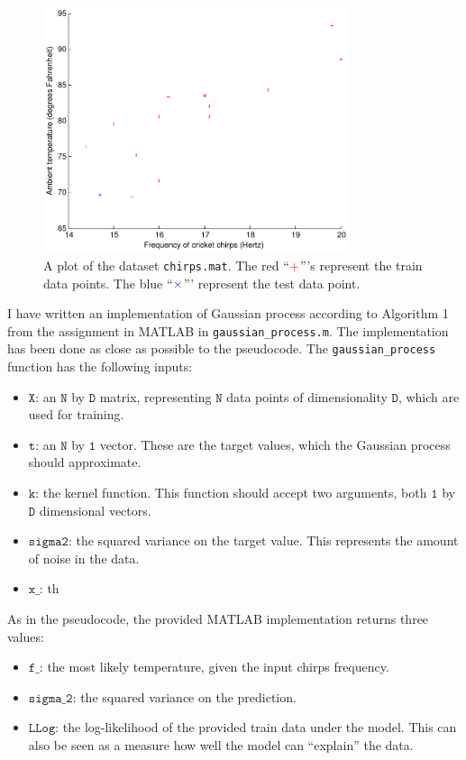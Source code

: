 \documentclass[a4paper,11pt]{article}
\newcommand{\T}[1]{\ensuremath{\mathtt{#1}}}
\begin{document}
\begin{figure}
  \begin{center}
  \caption{A plot of the dataset \texttt{chirps.mat}.  The red ``$\color{red}+$'''s represent the train data points. The blue ``$\color{blue}\times$''' represent the test data point.}
    \label{fig:ex2plot1}
    \includegraphics[width=0.8\textwidth]{ex2plot1}
  \end{center}
\end{figure}


I have written an implementation of Gaussian process according to Algorithm 1 from the assignment in MATLAB in \texttt{gaussian\_process.m}.  The implementation has been done as close as possible to the pseudocode.  The \texttt{gaussian\_process} function has the following inputs:
\begin{itemize}
\item $\T{X}$: an $\T{N}$ by $\T{D}$ matrix, representing $\T{N}$ data points of dimensionality $\T{D}$, which are used for training.
\item $\T{t}$: an $\T{N}$ by $\T{1}$ vector.  These are the target values, which the Gaussian process should approximate.
\item $\T{k}$: the kernel function.  This function should accept two arguments, both $\T{1}$ by $\T{D}$ dimensional vectors.
\item $\T{sigma2}$: the squared variance on the target value.  This represents the amount of noise in the data.
\item $\T{x\_}$: th
\end{itemize}
As in the pseudocode, the provided MATLAB implementation returns three values:
\begin{itemize}
\item $\T{f\_}$: the most likely temperature, given the input chirps frequency.
\item $\T{sigma\_2}$: the squared variance on the prediction.
\item $\T{LLog}$: the log-likelihood of the provided train data under the model.  This can also be seen as a measure how well the model can ``explain'' the data.
\end{itemize}  
\end{document}
